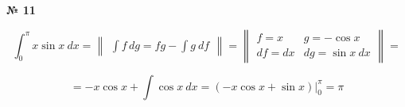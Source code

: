 \documentclass{article}
\begin{document}
\textbf{№ 11} 
\large

$$ \int_{0}^{\pi} x\sin{x} \ dx 
= \begin{Vmatrix} \int f \,dg = fg - \int g \ df \end{Vmatrix} 
= \begin{Vmatrix} f = x & g = -\cos{x} \\
                  df = dx  & dg = \sin{x} \ dx \end{Vmatrix} 
= $$

$$ = -x\cos{x} + \int \cos{x} \ dx
= \left( -x\cos{x} + \sin{x} \right) \bigg\vert_{0}^{\pi}
= \pi $$
\end{document}
